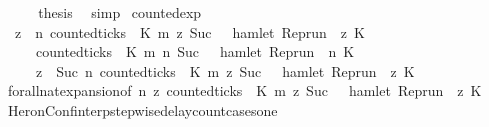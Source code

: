 \begin{isabellebody}
\ \ \isamarkupfalse%
\ \isamarkupfalse%
\ {\isacharquery}thesis\ \isamarkupfalse%
\ simp\isanewline
{}\isamarkupfalse%
%
\endisatagproof
{\isafoldproof}%
%
\isadelimproof
\isanewline
%
\endisadelimproof
\isanewline
{}\isamarkupfalse%
\ counted{\isacharunderscore}exp{\isacharcolon}\isanewline
\ \ {\isacartoucheopen}{\isacharparenleft}{\isasymforall}z\ {\isasymge}\ n{\isachardot}\ counted{\isacharunderscore}ticks\ {\isasymrho}\ K\ m\ z\ {\isacharparenleft}Suc\ {}{\isacharparenright}\ {\isasymlongrightarrow}\ hamlet\ {\isacharparenleft}{\isacharparenleft}Rep{\isacharunderscore}run\ {\isasymrho}{\isacharparenright}\ z\ K{\isacharprime}{\isacharparenright}{\isacharparenright}\isanewline
\ \ \ \ {\isacharequal}\ {\isacharparenleft}{\isacharparenleft}counted{\isacharunderscore}ticks\ {\isasymrho}\ K\ m\ n\ {\isacharparenleft}Suc\ {}{\isacharparenright}\ {\isasymlongrightarrow}\ hamlet\ {\isacharparenleft}{\isacharparenleft}Rep{\isacharunderscore}run\ {\isasymrho}{\isacharparenright}\ n\ K{\isacharprime}{\isacharparenright}{\isacharparenright}\isanewline
\ \ \ \ {\isasymand}\ {\isacharparenleft}{\isasymforall}z\ {\isasymge}\ Suc\ n{\isachardot}\ counted{\isacharunderscore}ticks\ {\isasymrho}\ K\ m\ z\ {\isacharparenleft}Suc\ {}{\isacharparenright}\ {\isasymlongrightarrow}\ hamlet\ {\isacharparenleft}{\isacharparenleft}Rep{\isacharunderscore}run\ {\isasymrho}{\isacharparenright}\ z\ K{\isacharprime}{\isacharparenright}{\isacharparenright}{\isacharparenright}{\isacartoucheclose}\isanewline
%
\isadelimproof
%
\endisadelimproof
%
\isatagproof
{}\isamarkupfalse%
\ forall{\isacharunderscore}nat{\isacharunderscore}expansion{\isacharbrackleft}of\ {\isacartoucheopen}n{\isacartoucheclose}\ {\isacartoucheopen}{\isasymlambda}z{\isachardot}\ counted{\isacharunderscore}ticks\ {\isasymrho}\ K\ m\ z\ {\isacharparenleft}Suc\ {}{\isacharparenright}\ {\isasymlongrightarrow}\ hamlet\ {\isacharparenleft}Rep{\isacharunderscore}run\ {\isasymrho}\ z\ K{\isacharprime}{\isacharparenright}{\isacartoucheclose}{\isacharbrackright}\ \isacommand{{\isachardot}}\isamarkupfalse%
\isanewline
\isanewline
%
%
\endisatagproof
{\isafoldproof}%
%
\isadelimproof
\isanewline
%
\endisadelimproof
{}\isamarkupfalse%
\ HeronConf{\isacharunderscore}interp{\isacharunderscore}stepwise{\isacharunderscore}delay{\isacharunderscore}count{\isacharunderscore}cases{\isacharunderscore}one{\isacharcolon}\isanewline

\end{isabellebody}
